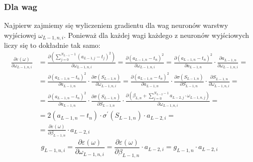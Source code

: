 \documentclass[]{article}
\begin{document}
		\subsubsection{Dla wag}
			Najpierw zajmiemy się wyliczeniem gradientu dla wag neuronów warstwy wyjściowej $ \omega_{L-1,n,i} $. Ponieważ dla każdej wagi każdego z neuronów wyjściowych liczy się to dokładnie tak samo:
			\begin{equation} \label{eq:gradientweightoutput}
				\begin{split}
					\frac{ \partial \varepsilon\left( \omega \right) }{ \partial \omega_{L-1,n,i} } &=
					 \frac{ \partial \left( \sum\limits_{j=0}^ {N_{L-1}-1 } \left( a_{L-1,j} - t_{j} \right)^{2} \right) }{ \partial \omega_{L-1,n,i} } = 
					 \frac{ \partial \left( a_{L-1,n} - t_{n} \right)^{2} }{ \partial \omega_{L-1,n,i} } = 
					\frac{ \partial \left( a_{L-1,n} - t_{n} \right)^{2} }{ \partial a_{L-1,n} } \cdot \frac{ \partial a_{L-1,n} }{ \partial \omega_{L-1,n,i} } = \\
					&= \frac{ \partial \left( a_{L-1,n} - t_{n} \right)^{2} }{ \partial a_{L-1,n} } \cdot \frac{ \partial \sigma\left( S_{L-1,n} \right) }{ \partial \omega_{L-1,n,i} } =
					 \frac{ \partial \left( a_{L-1,n} - t_{n} \right)^{2} }{ \partial a_{L-1,n} } \cdot \frac{ \partial \sigma\left( S_{L-1,n} \right) }{ \partial S_{L-1,n} } \cdot \frac{ \partial S_{L-1,n} }{ \partial \omega_{L-1,n,i} } = \\
					&= \frac{ \partial \left( a_{L-1,n} - t_{n} \right)^{2} }{ \partial a_{L-1,n} } \cdot \frac{ \partial \sigma\left( S_{L-1,n} \right) }{ \partial S_{L-1,n} } \cdot \frac{ \partial \left( \beta_{L,n} + \sum\limits_{j=0}^{ N_{L-2}-1 } a_{L-2,j} \cdot \omega_{L-1,n,j} \right) }{ \partial \omega_{L-1,n,i} } = \\
					&= 2\left( a_{L-1,n} - t_{n} \right) \cdot \sigma^{\prime}\left( S_{L-1,n} \right) \cdot a_{L-2,i} = \\
					&= \frac{ \partial \varepsilon\left( \omega \right) }{ \partial \beta_{L-1,n} } \cdot a_{L-2,i}
				\end{split}
			\end{equation}
			\begin{equation}
			g_{L-1,n,i} = \frac{ \partial \varepsilon\left( \omega \right) }{ \partial \omega_{L-1,n,i} } = \frac{ \partial \varepsilon\left( \omega \right) }{ \partial \beta_{L-1,n} } \cdot a_{L-2,i} = g_{L-1,n} \cdot a_{L-2,i}
			\end{equation}
			
\end{document}
